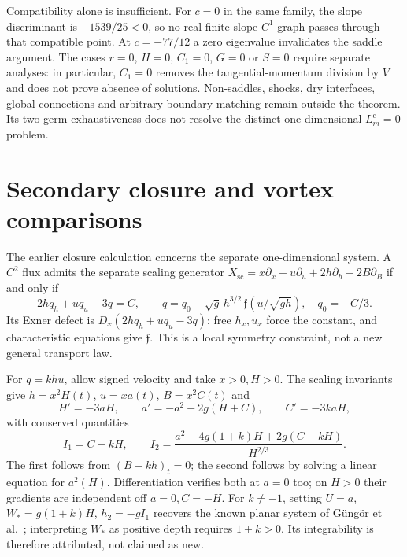 \documentclass[12pt,a4paper,oneside]{report}
\numberwithin{equation}{chapter}
\theoremstyle{remark}\newtheorem{remark}[theorem]{Remark}
\begin{document}
Compatibility alone is insufficient. For $c=0$ in the same family, the
slope discriminant is $-1539/25<0$, so no real finite-slope $C^1$ graph
passes through that compatible point. At $c=-77/12$ a zero eigenvalue
invalidates the saddle argument. The cases $r=0$, $H=0$, $C_1=0$, $G=0$
or $S=0$ require separate analyses: in particular, $C_1=0$ removes the
tangential-momentum division by $V$ and does not prove absence of solutions.
Non-saddles, shocks, dry interfaces, global connections and arbitrary
boundary matching remain outside the theorem. Its two-germ exhaustiveness
does not resolve the distinct one-dimensional $L_m^{\mathrm c}=0$ problem.

\section{Secondary closure and vortex comparisons}\label{sec:closures}
The earlier closure calculation concerns the separate one-dimensional system.
A $C^2$ flux admits the separate scaling generator $X_{\mathrm{sc}}=x\partial_x+u\partial_u+2h\partial_h+2B\partial_B$
if and only if
\begin{equation}\label{eq:closure}
 2hq_h+uq_u-3q=C,
 \qquad q=q_0+\sqrt g\,h^{3/2}\,\mathfrak f\!\left(u/\sqrt{gh}\right),
 \quad q_0=-C/3.
\end{equation}
Its Exner defect is $D_x(2hq_h+uq_u-3q)$: free $h_x,u_x$ force the constant,
and characteristic equations give $\mathfrak f$. This is a local symmetry
constraint, not a new general transport law.

For $q=khu$, allow signed velocity and take $x>0,H>0$. The scaling invariants
give $h=x^2H(t)$, $u=xa(t)$, $B=x^2C(t)$ and
\begin{equation}
 H'=-3aH,\qquad a'=-a^2-2g(H+C),\qquad C'=-3kaH,
\end{equation}
with conserved quantities
\begin{equation}
 I_1=C-kH,\qquad
 I_2=\frac{a^2-4g(1+k)H+2g(C-kH)}{H^{2/3}}.
\end{equation}
The first follows from $(B-kh)_t=0$; the second follows by solving a linear
equation for $a^2(H)$. Differentiation verifies both at $a=0$ too; on $H>0$
their gradients are independent off $a=0,C=-H$. For $k\ne-1$, setting
$U=a$, $W_*=g(1+k)H$, $h_2=-gI_1$ recovers the known planar system of
G\"ung\"or et al.~\cite[Eqs.~(3.16)--(3.17), (4.11)]{gungor2026};
interpreting $W_*$ as positive depth requires $1+k>0$. Its integrability
is therefore attributed, not claimed as new.
\end{document}
